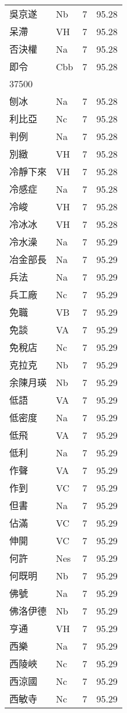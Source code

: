 \documentclass[twocolumn]{book}
\begin{document}
\begin{supertabular}{llrr}
吳京遂 & Nb & 7 &  95.28\\
呆滯 & VH & 7 &  95.28\\
否決權 & Na & 7 &  95.28\\
即令 & Cbb & 7 &  95.28\\
37500\\
刨冰 & Na & 7 &  95.28\\
利比亞 & Nc & 7 &  95.28\\
判例 & Na & 7 &  95.28\\
別緻 & VH & 7 &  95.28\\
冷靜下來 & VH & 7 &  95.28\\
冷感症 & Na & 7 &  95.28\\
冷峻 & VH & 7 &  95.28\\
冷冰冰 & VH & 7 &  95.28\\
冷水澡 & Na & 7 &  95.29\\
冶金部長 & Na & 7 &  95.29\\
兵法 & Na & 7 &  95.29\\
兵工廠 & Nc & 7 &  95.29\\
免職 & VB & 7 &  95.29\\
免談 & VA & 7 &  95.29\\
免稅店 & Nc & 7 &  95.29\\
克拉克 & Nb & 7 &  95.29\\
余陳月瑛 & Nb & 7 &  95.29\\
低語 & VA & 7 &  95.29\\
低密度 & Na & 7 &  95.29\\
低飛 & VA & 7 &  95.29\\
低利 & Na & 7 &  95.29\\
作聲 & VA & 7 &  95.29\\
作到 & VC & 7 &  95.29\\
但書 & Na & 7 &  95.29\\
佔滿 & VC & 7 &  95.29\\
伸開 & VC & 7 &  95.29\\
何許 & Nes & 7 &  95.29\\
何既明 & Nb & 7 &  95.29\\
佛號 & Na & 7 &  95.29\\
佛洛伊德 & Nb & 7 &  95.29\\
亨通 & VH & 7 &  95.29\\
西樂 & Na & 7 &  95.29\\
西陵峽 & Nc & 7 &  95.29\\
西涼國 & Nc & 7 &  95.29\\
西敏寺 & Nc & 7 &  95.29\\

\end{supertabular}
\end{document}
